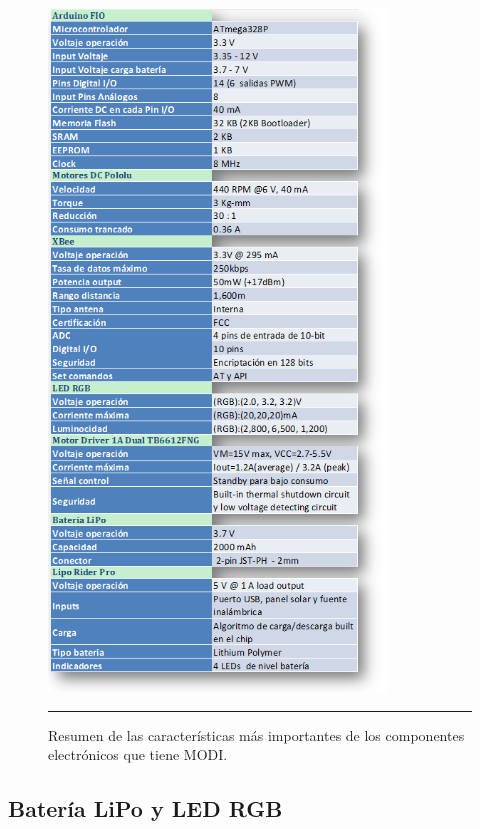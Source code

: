 \begin{figure}[htbp]
	\centering
		\includegraphics[width=0.8\textwidth]{./Figures/MODI/comparacionElo.png}
		\rule{35em}{0.5pt}
	\caption[Tabla caracteristicas mas importantes de los componentes Eléctronicos]{Resumen de las características más importantes de los componentes electrónicos que tiene MODI.}
	\label{fig:TablaElo}
\end{figure}

\subsection{Batería LiPo y LED RGB}

